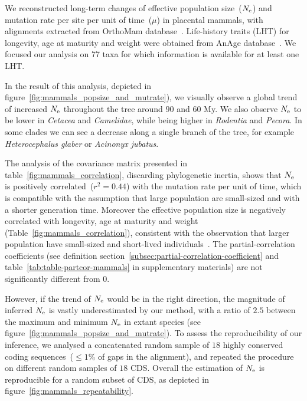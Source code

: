 We reconstructed long-term changes of effective population size~($N_{\mathrm{e}}$) and mutation rate per site per unit of time~($\mu$) in placental mammals, with alignments extracted from OrthoMam database~\citep{Ranwez2007,Scornavacca2019}.
Life-history traits (\acrshort{LHT}) for longevity, age at maturity and weight were obtained from AnAge database~\citep{DEMAGALHAES2009,Tacutu2012}.
We focused our analysis on 77 taxa for which information is available for at least one \acrshort{LHT}.

In the result of this analysis, depicted in figure~\ref{fig:mammals_popsize_and_mutrate}), we visually observe a global trend of increased $N_{\mathrm{e}}$ throughout the tree around $90$ and $60$ My.
We also observe $N_{\mathrm{e}}$ to be lower in \textit{Cetacea} and \textit{Camelidae}, while being higher in \textit{Rodentia} and \textit{Pecora}.
In some clades we can see a decrease along a single branch of the tree, for example \textit{Heterocephalus glaber} or \textit{Acinonyx jubatus}.

The analysis of the covariance matrix presented in table~\ref{fig:mammals_correlation}, discarding phylogenetic inertia, shows that $N_{\mathrm{e}}$ is positively correlated~($r^2 = 0.44$) with the mutation rate per unit of time, which is compatible with the assumption that large population are small-sized and with a shorter generation time.
Moreover the effective population size is negatively correlated with longevity, age at maturity and weight (Table~\ref{fig:mammals_correlation}), consistent with the observation that larger population have small-sized and short-lived individuals~\citep{Galtier2016,Romiguier2014}.
The partial-correlation coefficients (see definition section~\ref{subsec:partial-correlation-coefficient} and table~\ref{tab:table-partcor-mammals} in supplementary materials) are not significantly different from $0$.

However, if the trend of $N_{\mathrm{e}}$ would be in the right direction, the magnitude of inferred $N_{\mathrm{e}}$ is vastly underestimated by our method, with a ratio of $2.5$ between the maximum and minimum $N_{\mathrm{e}}$ in extant species (see figure~\ref{fig:mammals_popsize_and_mutrate}).
To assess the reproducibility of our inference, we analysed a concatenated random sample of $18$ highly conserved coding sequences~($\leq 1\%$ of gaps in the alignment), and repeated the procedure on different random samples of $18$ \acrshort{CDS}.
Overall the estimation of $N_{\mathrm{e}}$ is reproducible for a random subset of \acrshort{CDS}, as depicted in figure~\ref{fig:mammals_repeatability}.


